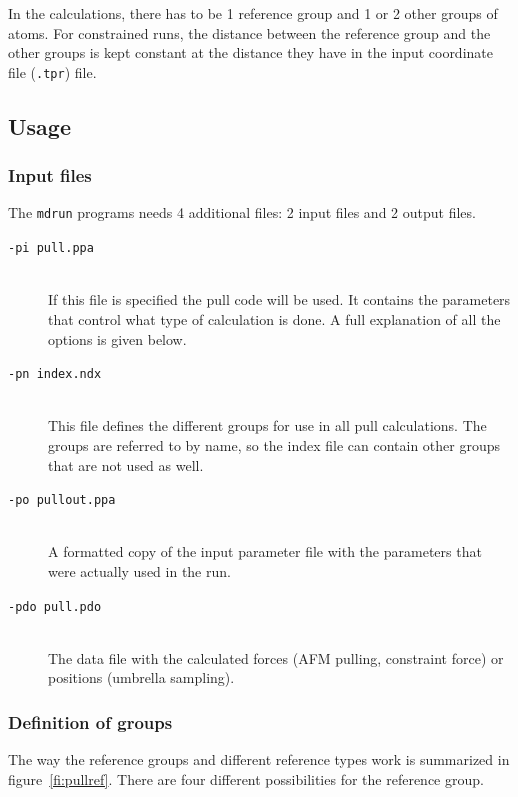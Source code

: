 In the calculations, there has to be 1 reference group and 1 or 2
other groups of atoms. For constrained runs, the distance between the
reference group and the other groups is kept constant at the distance
they have in the input coordinate file ({\tt .tpr}) file.

\subsection{Usage}

\subsubsection{Input files}

The {\tt mdrun} programs needs 4 additional files: 2 input files and 2
output files. 
\begin{description}
\item[\tt -pi pull.ppa]\mbox{}\\ If this file is specified the pull code will
be used. It contains the parameters that control what type of
calculation is done. A full explanation of all the options is given below.
\item[\tt -pn index.ndx]\mbox{}\\ This file defines the different groups for
use in all pull calculations. The groups are referred to by name, so
the index file can contain other groups that are not used as well. 
\item[\tt -po pullout.ppa]\mbox{}\\ A formatted copy of the input parameter
file with the parameters that were actually used in the run.
\item[\tt -pdo pull.pdo]\mbox{}\\ The data file with the calculated forces
(AFM pulling, constraint force) or positions (umbrella sampling).
\end{description}

\subsubsection{Definition of groups}

The way the reference groups and different reference types work is
summarized in figure~\ref{fi:pullref}. There are four different
possibilities for the reference group. 

